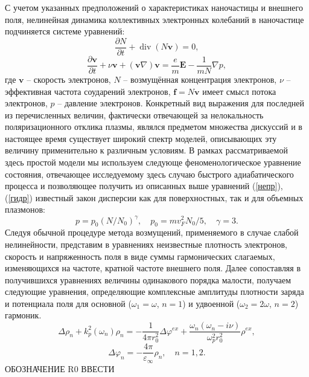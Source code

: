 \documentclass[12pt, a4paper]{article}
\renewcommand{\vec}{\mathbf}
\def \eps {\varepsilon}
\def \w {\omega}
\def \ph {\varphi}
\newcommand{\dt}[1]{\frac{\partial {#1}}{\partial t}}
\begin{document}
С учетом указанных предположений о характеристиках наночастицы и внешнего поля, нелинейная динамика коллективных электронных колебаний в наночастице подчиняется системе уравнений:
\begin{equation} 
	\label{непр}
	\dt{N} + \operatorname{div}(N \vec{v}) = 0,
\end{equation}
\begin{equation} 
	\label{гидр}
	\dt{\vec{v}} + \nu \vec{v} +(\vec{v} \nabla)\vec{v} = \frac{e}{m}\vec{E} - \frac{1}{mN} \nabla p, 
\end{equation}
где $\vec{v}$ – скорость электронов, $N$ – возмущённая концентрация электронов, $\nu$ – эффективная частота соударений электронов, $\vec{f} = N \vec{v}$ имеет смысл потока электронов, $p$ – давление электронов. Конкретный вид выражения для последней из перечисленных величин, фактически отвечающей за нелокальность поляризационного отклика плазмы, являлся предметом множества дискуссий и в настоящее время существует широкий спектр моделей, описывающих эту величину применительно к различным условиям. В рамках рассматриваемой здесь простой модели мы используем следующе феноменологическое уравнение состояния, отвечающее исследуемому здесь случаю быстрого адиабатического процесса и позволяющее получить из описанных выше уравнений (\ref{непр}), (\ref{гидр}) известный закон дисперсии как для поверхностных, так и для объемных плазмонов: 
\begin{equation}
	\label{p}
 p = p_0 (N/N_0)^\gamma, \quad p_0 = m v_F^2 N_0/5, \quad \gamma = 3.
\end{equation}
Следуя обычной процедуре метода возмущений, применяемого в случае слабой нелинейности, представим в уравнениях неизвестные плотность электронов, скорость и напряженность поля в виде суммы гармонических слагаемых, изменяющихся на частоте, кратной частоте внешнего поля. Далее сопоставляя в получившихся уравнениях величины одинакового порядка малости, получаем следующие уравнения, определяющие комплексные амплитуды плотности заряда и потенциала поля для основной ($\w_1=\w$, $n=1$) и удвоенной ($\w_2=2\w$, $n=2$) гармоник.
\begin{equation} 
	\label{rho_sys}
 \Delta \rho_n + k_p^2(\w_n)\rho_n = -\frac{1}{4 \pi r_0^2} \Delta \ph^{ex} + \frac{\w_n(\w_n - i \nu)}{\w_p^2r_0^2} \rho^{ex},
\end{equation}
\begin{equation} 
	\label{phi_sys}
 \Delta \ph_n = - \frac{4 \pi}{\eps_\infty} \rho_n, \quad n = 1,2. 
\end{equation}
ОБОЗНАЧЕНИЕ R0 ВВЕСТИ
\end{document}
